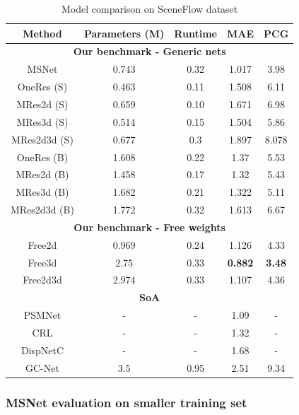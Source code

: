 \documentclass[10pt]{article}
\begin{document}
\begin{table}[]
    \centering
    \begin{tabular}{ c|c|c|c|c }
    Method & Parameters (M) & Runtime & MAE & PCG \\
    
    \hline
    \multicolumn{5}{c}{ \textbf{Our benchmark - Generic nets} } \\
    \hline
    MSNet & 0.743 & 0.32 & 1.017 & 3.98 \\
    \hline
    OneRes (S) & 0.463 & 0.11 & 1.508 & 6.11 \\
    MRes2d (S) & 0.659 & 0.10 & 1.671 & 6.98 \\
    MRes3d (S) & 0.514 & 0.15 & 1.504 & 5.86 \\
    MRes2d3d (S) & 0.677 & 0.3 & 1.897 & 8.078 \\
    \hline
    OneRes (B) & 1.608 & 0.22 & 1.37 & 5.53 \\
    MRes2d (B) & 1.458 & 0.17 & 1.32 & 5.43 \\
    MRes3d (B) & 1.682 & 0.21 & 1.322 & 5.11 \\
    MRes2d3d (B) & 1.772 & 0.32 & 1.613 & 6.67 \\
    \hline
    \multicolumn{5}{c}{ \textbf{Our benchmark - Free weights} } \\
    \hline
    Free2d & 0.969 & 0.24 & 1.126 & 4.33 \\
    Free3d & 2.75 & 0.33 & \textbf{0.882} & \textbf{3.48} \\
    Free2d3d & 2.974 & 0.33 & 1.107 & 4.36 \\
    \hline
    \multicolumn{5}{c}{ \textbf{SoA} } \\
    \hline
    PSMNet\cite{Chang2018PyramidNetwork} & - & - & 1.09 & - \\
    CRL\cite{Pang2018CascadeMatching} & - & - & 1.32 & - \\
    DispNetC\cite{Mayer2016ALD} & - & - & 1.68 & - \\
    GC-Net\cite{Kendall2017End-to-EndRegression} & 3.5 & 0.95 & 2.51 & 9.34 \\
    
    \hline
    \end{tabular}
    \caption{Model comparison on SceneFlow dataset}
    \label{tab:results}
\end{table}

\subsubsection{MSNet evaluation on smaller training set}
\end{document}
